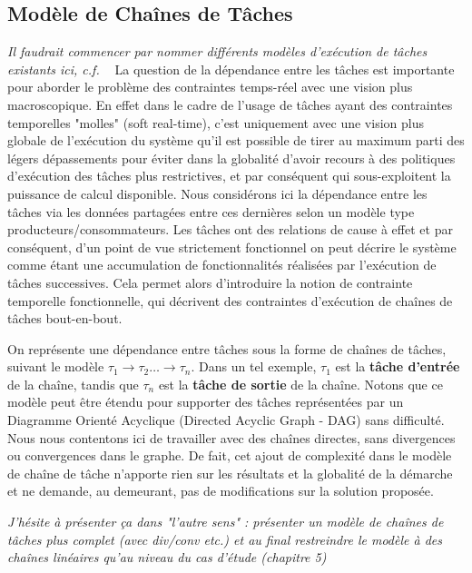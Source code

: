 \documentclass[french, a4paper, 11pt, twoside, pdftex]{StyleThese}
\begin{document}
    \subsection{Modèle de Chaînes de Tâches}
    
    \textit{Il faudrait commencer par nommer différents modèles d'exécution de tâches existants ici, c.f. ~\cite{friese_estimating_2018}}
    La question de la dépendance entre les tâches est importante pour aborder le problème des contraintes temps-réel avec une vision plus macroscopique. En effet dans le cadre de l'usage de tâches ayant des contraintes temporelles "molles" (soft real-time), c'est uniquement avec une vision plus globale de l'exécution du système qu'il est possible de tirer au maximum parti des légers dépassements pour éviter dans la globalité d'avoir recours à des politiques d'exécution des tâches plus restrictives, et par conséquent qui sous-exploitent la puissance de calcul disponible.
    Nous considérons ici la dépendance entre les tâches via les données partagées entre ces dernières selon un modèle type producteurs/consommateurs. Les tâches ont des relations de cause à effet et par conséquent, d'un point de vue strictement fonctionnel on peut décrire le système comme étant une accumulation de fonctionnalités réalisées par l'exécution de tâches successives. Cela permet alors d'introduire la notion de contrainte temporelle fonctionnelle, qui décrivent des contraintes d'exécution de chaînes de tâches bout-en-bout.
    
    
    On représente une dépendance entre tâches sous la forme de chaînes de tâches, suivant le modèle $\tau_{1} \rightarrow \tau_2 \ldots \rightarrow \tau_n$. Dans un tel exemple, $\tau_1$ est la \textbf{tâche d'entrée} de la chaîne, tandis que $\tau_n$ est la \textbf{tâche de sortie} de la chaîne. Notons que ce modèle peut être étendu pour supporter des tâches représentées par un Diagramme Orienté Acyclique (Directed Acyclic Graph - DAG) sans difficulté. Nous nous contentons ici de travailler avec des chaînes directes, sans divergences ou convergences dans le graphe. De fait, cet ajout de complexité dans le modèle de chaîne de tâche n'apporte rien sur les résultats et la globalité de la démarche et ne demande, au demeurant, pas de modifications sur la solution proposée. 
    
    \textit{J'hésite à présenter ça dans "l'autre sens" : présenter un modèle de chaînes de tâches plus complet (avec div/conv etc.) et au final restreindre le modèle à des chaînes linéaires qu'au niveau du cas d'étude (chapitre 5)}
     
\end{document}
